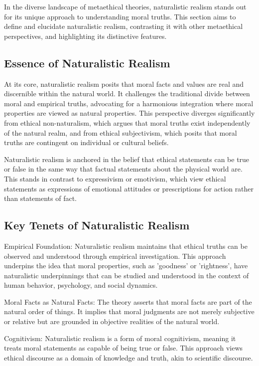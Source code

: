 \documentclass[12pt,a4paper]{article}
\begin{document}
In the diverse landscape of metaethical theories, naturalistic realism stands out for its unique approach to understanding moral truths. This section aims to define and elucidate naturalistic realism, contrasting it with other metaethical perspectives, and highlighting its distinctive features.

\subsection{Essence of Naturalistic Realism}
At its core, naturalistic realism posits that moral facts and values are real and discernible within the natural world. It challenges the traditional divide between moral and empirical truths, advocating for a harmonious integration where moral properties are viewed as natural properties. This perspective diverges significantly from ethical non-naturalism, which argues that moral truths exist independently of the natural realm, and from ethical subjectivism, which posits that moral truths are contingent on individual or cultural beliefs.

Naturalistic realism is anchored in the belief that ethical statements can be true or false in the same way that factual statements about the physical world are. This stands in contrast to expressivism or emotivism, which view ethical statements as expressions of emotional attitudes or prescriptions for action rather than statements of fact.

\subsection{Key Tenets of Naturalistic Realism}
Empirical Foundation: Naturalistic realism maintains that ethical truths can be observed and understood through empirical investigation. This approach underpins the idea that moral properties, such as 'goodness' or 'rightness', have naturalistic underpinnings that can be studied and understood in the context of human behavior, psychology, and social dynamics.

Moral Facts as Natural Facts: The theory asserts that moral facts are part of the natural order of things. It implies that moral judgments are not merely subjective or relative but are grounded in objective realities of the natural world.

Cognitivism: Naturalistic realism is a form of moral cognitivism, meaning it treats moral statements as capable of being true or false. This approach views ethical discourse as a domain of knowledge and truth, akin to scientific discourse.
\end{document}
